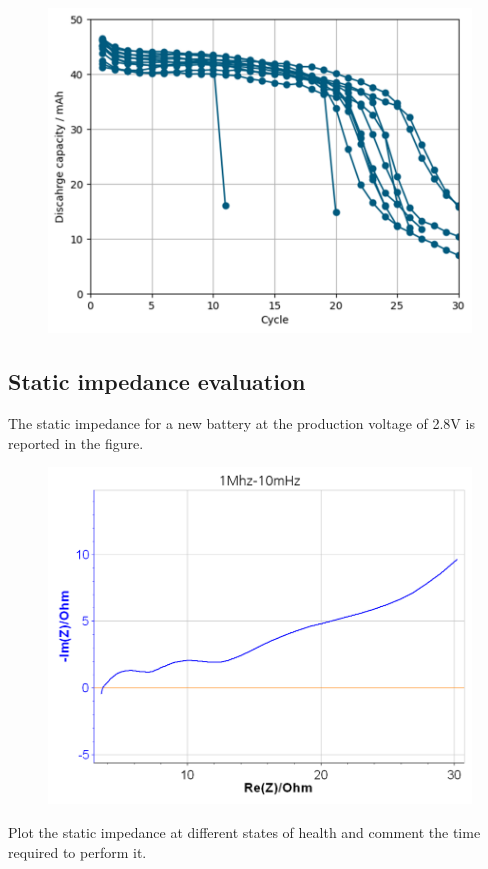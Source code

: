 \begin{figure}
    \centering
    \includegraphics[width=0.8\linewidth]{figures/application4/image1.png}
\end{figure}

\subsection{Static impedance evaluation}

The static impedance for a new battery at the production voltage of 2.8V is reported in the figure.

\begin{figure}
    \centering
    \includegraphics[width=0.8\linewidth]{figures/application4/image2.png}
\end{figure}

\colorbox{BurntOrange}{Plot the static impedance at different states of health and comment the time required to perform it.}

